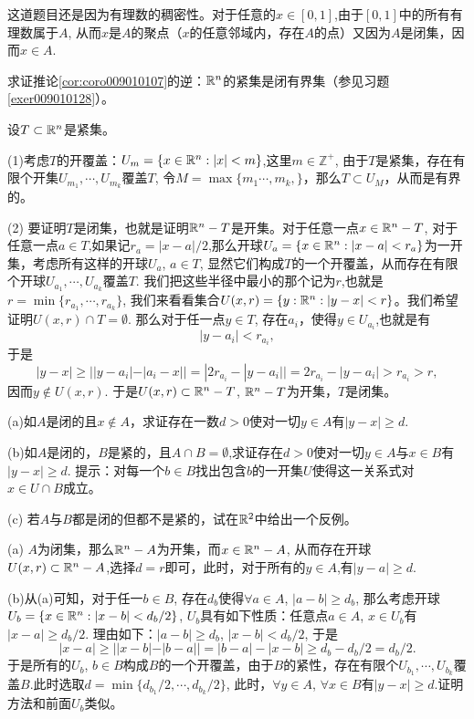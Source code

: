 \begin{problemset}
这道题目还是因为有理数的稠密性。对于任意的$x \in [0, 1]$,由于$[0, 1]$中的所有有理数属于$A$, 从而$x$是$A$的聚点（$x$的任意邻域内，存在$A$的点）又因为$A$是闭集，因而$x \in A$.

\item\label{exer009010120} 求证推论\ref{cor:coro009010107}的逆：$\mathbb{R}^n$的紧集是闭有界集（参见习题\ref{exer009010128}）。

设$T \subset \mathbb{R}^n$是紧集。

(1)考虑$T$的开覆盖：$U_m = \{x \in \mathbb{R}^n : |x| < m\}$,这里$m \in \mathbb{Z}^+$, 由于$T$是紧集，存在有限个开集$U_{m_1}, \cdots, U_{m_k}$覆盖$T$, 令$M = \max\{m_1\cdots, m_k,\}$，那么$T \subset U_M$，从而是有界的。

(2) 要证明$T$是闭集，也就是证明$\mathbb{R}^n-T$是开集。对于任意一点$x \in \mathbb{R}^n - T$, 对于任意一点$a \in T$,如果记$r_a = |x - a| / 2$,那么开球$U_a = \{x \in \mathbb{R}^n : |x - a| < r_a\}$为一开集，考虑所有这样的开球$U_a$, $a \in T$, 显然它们构成$T$的一个开覆盖，从而存在有限个开球$U_{a_1}, \cdots, U_{a_k}$覆盖$T$. 我们把这些半径中最小的那个记为$r$,也就是$r = \min\{r_{a_1}, \cdots, r_{a_k}\}$, 我们来看看集合$U(x, r) = \{y : \mathbb{R}^n : |y-x|<r\}$。我们希望证明$U(x, r)\cap T = \emptyset$. 那么对于任一点$y \in T$, 存在$a_i$，使得$y \in U_{a_i}$,也就是有
\[
|y - a_i| < r_{a_i},
\]
于是
\[
|y - x| \ge ||y - a_i| - |a_i - x|| = |2r_{a_i} - |y-a_i|| = 2r_{a_i} - |y-a_i| > r_{a_i} > r,
\]
因而$y \not \in U(x, r)$. 于是$U(x, r) \subset \mathbb{R}^n - T$, $\mathbb{R}^n-T$为开集，$T$是闭集。

\item (a)如$A$是闭的且$x \not\in A$，求证存在一数$d > 0$使对一切$y \in A$有$|y-x| \ge d$.

(b)如$A$是闭的，$B$是紧的，且$A \cap B =\emptyset$,求证存在$d>0$使对一切$y \in A$与$x \in B$有$|y-x| \ge d$. 提示：对每一个$b \in B$找出包含$b$的一开集$U$使得这一关系式对$x \in U \cap B$成立。

(c) 若$A$与$B$都是闭的但都不是紧的，试在$\mathbb{R}^2$中给出一个反例。

(a) $A$为闭集，那么$\mathbb{R}^n-A$为开集，而$x \in \mathbb{R}^n-A$, 从而存在开球$U(x, r) \subset \mathbb{R}^n-A$,选择$d=r$即可，此时，对于所有的$y \in A$,有$|y-a| \ge d$.

(b)从(a)可知，对于任一$b \in B$, 存在$d_b$使得$\forall a \in A$, $|a-b| \ge d_b$, 那么考虑开球$U_b = \{x \in \mathbb{R}^n : |x - b| < d_b/2\}$, $U_b$具有如下性质：任意点$a \in A$, $x \in U_b$有$|x-a| \ge d_b/2$. 理由如下：$|a-b| \ge d_b$, $|x - b| < d_b/2$, 于是
\[
|x-a| \ge ||x-b| - |b-a|| = |b-a| - |x-b| \ge d_b - d_b/2 = d_b/2.
\]
于是所有的$U_b$, $b \in B$构成$B$的一个开覆盖，由于$B$的紧性，存在有限个$U_{b_1}, \cdots, U_{b_k}$覆盖$B$.此时选取$d = \min\{d_{b_1}/2,\cdots, d_{b_k}/2\}$, 此时，$\forall y \in A$, $\forall x \in B$有$|y-x| \ge d$.证明方法和前面$U_b$类似。


\end{problemset}

